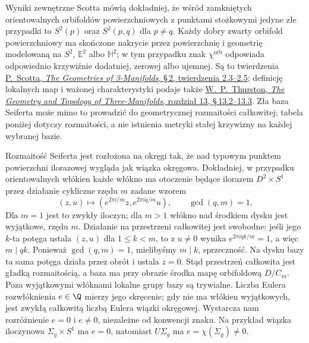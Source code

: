 Wyniki zewnętrzne Scotta mówią dokładniej, że wśród zamkniętych
orientowalnych orbifoldów powierzchniowych z punktami stożkowymi
jedyne złe przypadki to $S^2(p)$ oraz $S^2(p,q)$ dla $p\ne q$.
Każdy dobry zwarty orbifold powierzchniowy ma skończone
nakrycie przez powierzchnię i geometrię modelowaną na
$S^2$, $\mathbb E^2$ albo $\mathbb H^2$; w tym przypadku
znak $\chi^{\mathrm{orb}}$ odpowiada odpowiednio krzywiźnie
dodatniej, zerowej albo ujemnej. Są to twierdzenia
\href{https://sschleimer.warwick.ac.uk/Teach/2021_3MFDS/References/1983the_geometries_of_three-manifolds.pdf}
{P.\ Scotta, \emph{The Geometries of 3-Manifolds},
\S\,2, twierdzenia 2.3--2.5}; definicję lokalnych map i
ważonej charakterystyki podaje także
\href{https://library.slmath.org/nonmsri/gt3m/PDF/13.pdf}
{W.\ P.\ Thurston, \emph{The Geometry and Topology of
Three-Manifolds}, rozdział 13, \S\,13.2--13.3}.
Zła baza Seiferta może mimo to prowadzić do geometrycznej
rozmaitości całkowitej; tabela poniżej dotyczy rozmaitości,
a nie istnienia metryki stałej krzywizny na każdej wybranej bazie.

Rozmaitość Seiferta jest rozłożona na okręgi tak, że nad typowym
punktem powierzchni ilorazowej wygląda jak wiązka okręgowa.
Dokładniej, w przypadku orientowalnych włókien każde włókno ma
otoczenie będące ilorazem $D^2\times S^1$ przez działanie
cykliczne rzędu $m$ zadane wzorem
\[
 (z,u)\longmapsto
 (e^{2\pi i/m}z,e^{2\pi iq/m}u),\qquad \gcd(q,m)=1.
\]
Dla $m=1$ jest to zwykły iloczyn; dla $m>1$ włókno nad środkiem
dysku jest wyjątkowe, rzędu $m$. Działanie na przestrzeni
całkowitej jest swobodne: jeśli jego $k$-ta potęga ustala
$(z,u)$ dla $1\leq k<m$, to z $u\ne0$ wynika
$e^{2\pi iqk/m}=1$, a więc $m\mid qk$. Ponieważ
$\gcd(q,m)=1$, mielibyśmy $m\mid k$, sprzeczność.
Na dysku bazy ta sama potęga działa przez obrót i ustala
$z=0$. Stąd przestrzeń całkowita jest gładką rozmaitością,
a baza ma przy obrazie środka mapę orbifoldową $D/C_m$.
Poza wyjątkowymi włóknami lokalne grupy bazy są trywialne.
Liczba Eulera rozwłóknienia $e\in\Q$ mierzy jego skręcenie;
gdy nie ma włókien wyjątkowych, jest zwykłą całkowitą
liczbą Eulera wiązki okręgowej. Wystarcza nam rozróżnienie
$e=0$ i $e\ne0$, niezależne od konwencji znaku.
Na przykład wiązka iloczynowa $\Sigma_g\times S^1$ ma $e=0$,
natomiast $U\Sigma_g$ ma $e=\chi(\Sigma_g)\ne0$.

